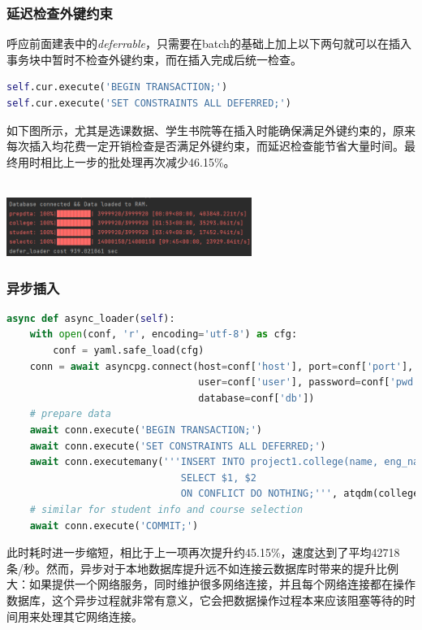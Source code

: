 \subsubsection{延迟检查外键约束}
呼应前面建表中的\emph{deferrable}，只需要在batch的基础上加上以下两句就可以在插入事务块中暂时不检查外键约束，而在插入完成后统一检查。
\begin{lstlisting}[language=python]
self.cur.execute('BEGIN TRANSACTION;')
self.cur.execute('SET CONSTRAINTS ALL DEFERRED;')
\end{lstlisting}
\vspace{-3em}\par
如下图所示，尤其是选课数据、学生书院等在插入时能确保满足外键约束的，原来每次插入均花费一定开销检查是否满足外键约束，而延迟检查能节省大量时间。最终用时相比上一步的批处理再次减少46.15\%。\\~\\
\centerline{\includegraphics[width=0.6\textwidth]{pic/def.png}}

\subsubsection{异步插入}
\begin{lstlisting}[language=python]
async def async_loader(self):
    with open(conf, 'r', encoding='utf-8') as cfg:
        conf = yaml.safe_load(cfg)
    conn = await asyncpg.connect(host=conf['host'], port=conf['port'],
                                 user=conf['user'], password=conf['pwd'],
                                 database=conf['db'])
    # prepare data
    await conn.execute('BEGIN TRANSACTION;')
    await conn.execute('SET CONSTRAINTS ALL DEFERRED;')
    await conn.executemany('''INSERT INTO project1.college(name, eng_name)
                        	  SELECT $1, $2
                        	  ON CONFLICT DO NOTHING;''', atqdm(college))
    # similar for student info and course selection
    await conn.execute('COMMIT;')
\end{lstlisting}
\vspace{-3em}\par
此时耗时进一步缩短，相比于上一项再次提升约45.15\%，速度达到了平均42718条/秒。然而，异步对于本地数据库提升远不如连接云数据库时带来的提升比例大：如果提供一个网络服务，同时维护很多网络连接，并且每个网络连接都在操作数据库，这个异步过程就非常有意义，它会把数据操作过程本来应该阻塞等待的时间用来处理其它网络连接。\\\vspace{.3em}

